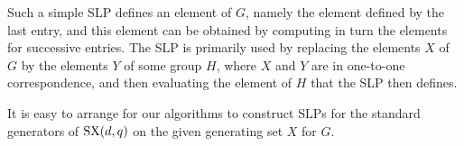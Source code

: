 \documentclass[12pt]{article}
\def\SX{{\rm SX}}
\begin{document}
Such a simple SLP defines an element 
of $G$, namely the element defined by the last entry, and this element 
can be obtained by computing in turn
the elements for successive entries.
The SLP is primarily used by replacing the elements 
$X$ of $G$ by the elements $Y$ of some group
$H$, where $X$ and $Y$ are in one-to-one correspondence, and then evaluating 
the element of $H$ that the SLP then defines.

It is easy to arrange for our algorithms to 
construct SLPs for the standard generators of 
$\SX(d,q)$ on the given generating set $X$ for $G$.

\end{document}
